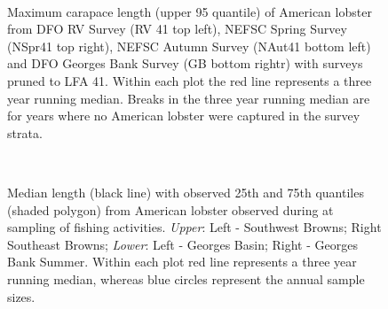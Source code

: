 \documentclass[11pt]{article}
\newcommand{\D}{.}
\newcommand{\e}{/backup/bio_data/bio.lobster/figures/} %
\begin{document}


\begin{figure}
\centering
{}\\

\caption{Maximum carapace length (upper 95 quantile) of American lobster from DFO RV Survey (RV 41 top left), NEFSC Spring Survey (NSpr41 top right), NEFSC Autumn Survey (NAut41 bottom left) and DFO Georges Bank Survey (GB bottom rightr) with surveys pruned to LFA 41. Within each plot the red line represents a three year running median. Breaks in the three year running median are for years where no American lobster were captured in the survey strata. }
\end{figure}
\clearpage


\begin{figure}

\\
                
    \caption{Median length (black line) with observed 25th and 75th quantiles (shaded polygon) from American lobster observed during at sampling of fishing activities. \emph{Upper}: Left - Southwest Browns; Right Southeast Browns; \emph{Lower}: Left - Georges Basin; Right - Georges Bank Summer. Within each plot red line represents a three year running median, whereas blue circles represent the annual sample sizes.}

\end{figure}



\end{document}
